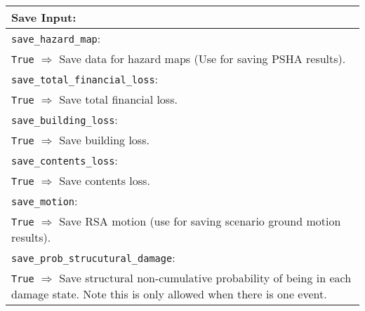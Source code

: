 \documentclass[a4paper, 12pt]{report}
\begin{document}
\vspace{2em}
\begin{tabular}{|p{\textwidth}|}
\hline
\vspace{0.3em} \noindent \Large \textbf{Save Input:} \normalsize \\
\hline \vspace{0.1em} \texttt{save\_hazard\_map}: \\
\texttt{True} $\Rightarrow$ Save data for hazard maps (Use for saving PSHA results). \\
\hline \vspace{0.1em} \texttt{save\_total\_financial\_loss}: \\
\texttt{True} $\Rightarrow$ Save total financial loss. \\
 \hline
\vspace{0.1em} \texttt{save\_building\_loss}: \\
\texttt{True} $\Rightarrow$ Save building loss. \\
 \hline
\vspace{0.1em} \texttt{save\_contents\_loss}: \\
 \texttt{True} $\Rightarrow$ Save contents loss. \\
\hline \vspace{0.1em} \texttt{save\_motion}: \\
\texttt{True} $\Rightarrow$ Save RSA motion (use for saving scenario ground motion results). \\
\hline \vspace{0.1em} \texttt{save\_prob\_strucutural\_damage}: \\
\texttt{True} $\Rightarrow$ Save structural non-cumulative
probability of being in each
damage state.  Note this is only allowed when there is one event. \\
\hline
 \end{tabular}
\end{document}
